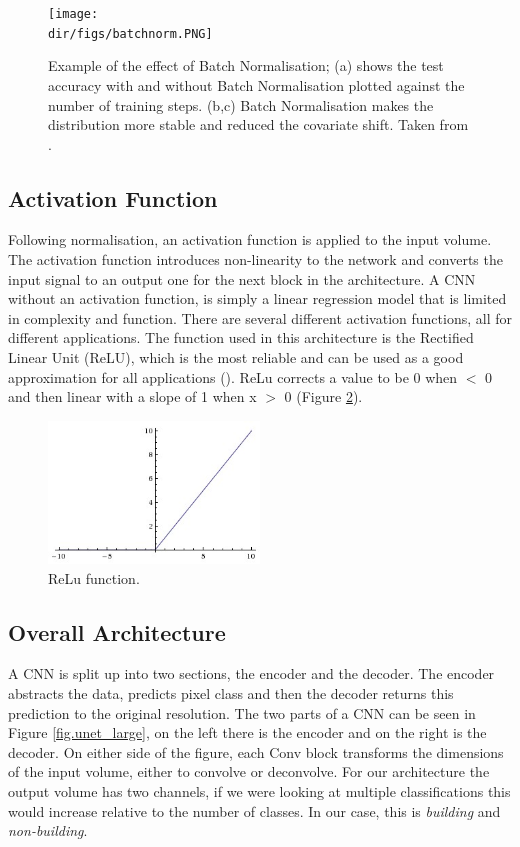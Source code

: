 \begin{figure}[htpb]
    \centering
    \texttt{[image: \\dir/figs/batchnorm.PNG]}
    \caption[Example of the effect of Batch Normalisation]{Example of the effect of Batch Normalisation; (a) shows the test accuracy with and without Batch Normalisation plotted against the number of training steps. (b,c) Batch Normalisation makes the distribution more stable and reduced the covariate shift. Taken from \citet{ioffe15}.}
    \label{fig.batchnorm}
\end{figure}
\subsection{Activation Function}
Following normalisation, an activation function is applied to the input volume. The activation function introduces non-linearity to the network and converts the input signal to an output one for the next block in the architecture. A CNN without an activation function, is simply a linear regression model that is limited in complexity and function. There are several different activation functions, all for different applications. The function used in this architecture is the Rectified Linear Unit (ReLU), which is the most reliable and can be used as a good approximation for all applications (\cite{krizhevsky17}). ReLu corrects a value to be 0 when $<$ 0 and then linear with a slope of 1 when x $>$ 0 (Figure \ref{fig.reluA}). 
\par

\begin{figure}[htpb]
    \centering
    \includegraphics[width=0.5\textwidth]{Part2/chapter3/chapter/figs/relu.jpeg}
    \caption{ReLu function.}
    \label{fig.reluA}
\end{figure}
\subsection{Overall Architecture}
A CNN is split up into two sections, the encoder and the decoder. The encoder abstracts the data, predicts pixel class and then the decoder returns this prediction to the original resolution. The two parts of a CNN can be seen in Figure \ref{fig.unet_large}, on the left there is the encoder and on the right is the decoder. On either side of the figure, each Conv block transforms the dimensions of the input volume, either to convolve or deconvolve. For our architecture the output volume has two channels, if we were looking at multiple classifications this would increase relative to the number of classes. In our case, this is \textit{building} and \textit{non-building}. 

